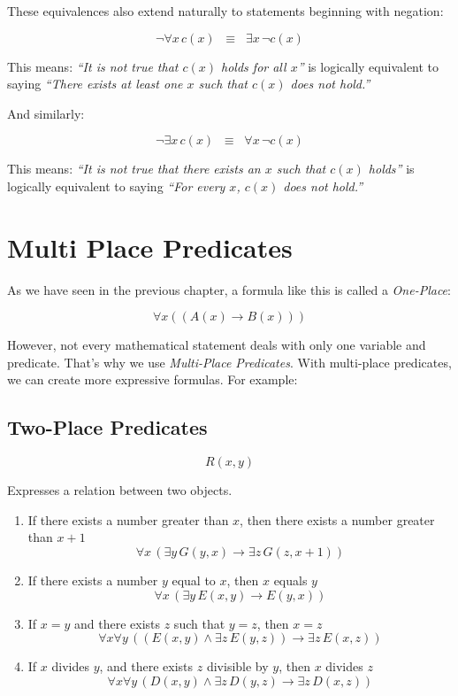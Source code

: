 \documentclass[12pt,a4paper,openany]{article}
\begin{document}
These equivalences also extend naturally to statements beginning with
negation:

\[
\lnot \forall x \, c(x) \;\;\equiv\;\; \exists x \, \lnot c(x)
\]

This means: \emph{``It is not true that \(c(x)\) holds for all \(x\)''}
is logically equivalent to saying \emph{``There exists at least one
\(x\) such that \(c(x)\) does not hold.''}

And similarly:

\[
\lnot \exists x \, c(x) \;\;\equiv\;\; \forall x \, \lnot c(x)
\]

This means: \emph{``It is not true that there exists an \(x\) such that
\(c(x)\) holds''} is logically equivalent to saying \emph{``For every
\(x\), \(c(x)\) does not hold.''}



\section{Multi Place Predicates}

As we have seen in the previous chapter, a formula like this is called a
\emph{One-Place}:

\[\forall x((A(x) \to B(x)))\]

However, not every mathematical statement deals with only one variable
and predicate. That's why we use \emph{Multi-Place Predicates}. With
multi-place predicates, we can create more expressive formulas. For
example:

\subsection{Two-Place Predicates}\label{two-place-predicates}

\[R(x,y)\]

Expresses a relation between two objects.

\begin{enumerate}
\def\labelenumi{\arabic{enumi}.}
\item
  If there exists a number greater than \(x\), then there exists a
  number greater than \(x+1\)
  \[\forall x \, (\exists y \, G(y,x) \to \exists z \, G(z,x+1))\]
\item
  If there exists a number \(y\) equal to \(x\), then \(x\) equals \(y\)
  \[\forall x \, (\exists y \, E(x,y) \to E(y,x))\]
\item
  If \(x=y\) and there exists \(z\) such that \(y=z\), then \(x=z\)
  \[\forall x \forall y \, ((E(x,y) \land \exists z \, E(y,z)) \to \exists z \, E(x,z))\]
\item
  If \(x\) divides \(y\), and there exists \(z\) divisible by \(y\),
  then \(x\) divides \(z\)
  \[\forall x \forall y \, (D(x,y) \land \exists z \, D(y,z) \to \exists z \, D(x,z))\]
\end{enumerate}
\end{document}
